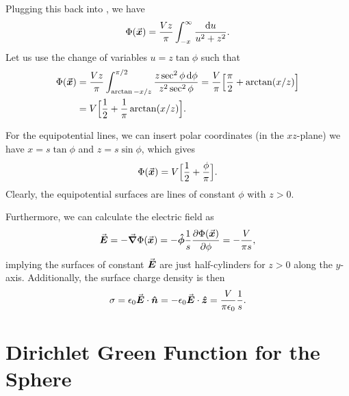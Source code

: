 Plugging this back into , we have
\begin{eqnarray}
    \Phi(\va*{x}) = \frac{V z}{\pi} \int_{-x}^{\infty} \frac{\dd{u}}{u^2 + z^2}
.\end{eqnarray}
Let us use the change of variables $u = z \tan{\phi}$ such that
\begin{align}
    \Phi(\va*{x}) &= \frac{Vz}{\pi} \int_{\arctan{-x/z}}^{\pi/2} \frac{z \sec^2{\phi} \dd{\phi}}{z^2 \sec^2{\phi}} = \frac{V}{\pi} \Big[ \frac{\pi}{2} + \arctan(x/z) \Big] \nonumber \\
    &= V \Big[ \frac{1}{2} + \frac{1}{\pi} \arctan(x/z) \Big]
.\end{align}

For the equipotential lines, we can insert polar coordinates (in the $xz$-plane) we have $x = s \tan{\phi}$ and $z = s \sin{\phi}$, which gives
\begin{eqnarray}
    \Phi(\va*{x}) = V \Big[ \frac{1}{2} + \frac{\phi}{\pi} \Big]
.\end{eqnarray}
Clearly, the equipotential surfaces are lines of constant $\phi$ with $z > 0$.

Furthermore, we can calculate the electric field as
\begin{align}
    \va*{E} = - \grad \Phi(\va*{x}) = - \vu*{\phi} \frac{1}{s} \pdv{\Phi(\va*{x})}{\phi} = - \frac{V}{\pi s}
,\end{align}
implying the surfaces of constant $\va*{E}$ are just half-cylinders for $z > 0$ along the $y$-axis.
Additionally, the surface charge density is then
\begin{eqnarray}
    \sigma = \epsilon_0 \va*{E} \cdot \vu*{n} = - \epsilon_0 \va*{E} \cdot \vu*{z} = \frac{V}{\pi \epsilon_0} \frac{1}{s}
.\end{eqnarray}

\section{Dirichlet Green Function for the Sphere}


